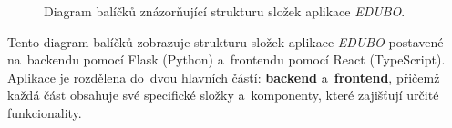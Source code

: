 \documentclass[male,czech,api_bc]{kitheses}
\begin{document}
\begin{figure}[H]
	\centering
	\caption{Diagram balíčků znázorňující strukturu složek aplikace \textit{EDUBO}.}
	\label{fig:package-diagram-1}
\end{figure}

Tento diagram balíčků zobrazuje strukturu složek aplikace \textit{EDUBO} postavené na~backendu pomocí Flask (Python) a~frontendu pomocí React (TypeScript). Aplikace je rozdělena do~dvou hlavních částí: \textbf{backend} a~\textbf{frontend}, přičemž každá část obsahuje své specifické složky a~komponenty, které zajišťují určité funkcionality.
\end{document}
